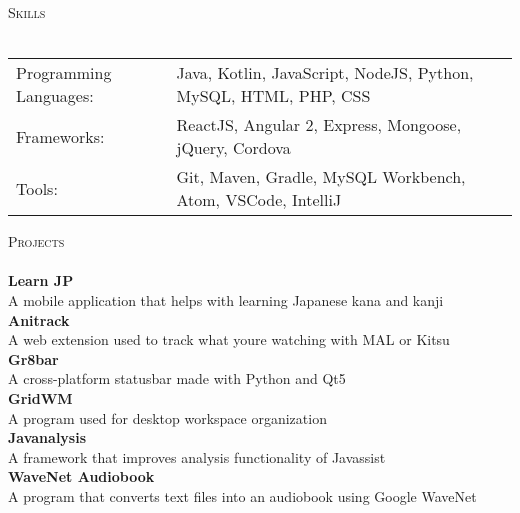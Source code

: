 \documentclass[a4paper]{article}
\newcommand{\lineunder} {
    \vspace*{-8pt} \\
    \hspace*{-18pt} \hrulefill \\
}
\newcommand{\header} [1] {
    {\hspace*{-18pt}\vspace*{6pt} \textsc{#1}}
    \vspace*{-6pt} \lineunder
}
\begin{document}
\header{Skills}
\vspace{2mm}
\begin{tabular}{ l l }
	Programming Languages: & Java, Kotlin, JavaScript, NodeJS, Python, MySQL, HTML, PHP, CSS \\
	Frameworks:            & ReactJS, Angular 2, Express, Mongoose, jQuery, Cordova          \\
	Tools:                 & Git, Maven, Gradle, MySQL Workbench, Atom, VSCode, IntelliJ     \\
\end{tabular}
\vspace{2mm}

\header{Projects}
{\textbf{Learn JP}}\\
A mobile application that helps with learning Japanese kana and kanji\\
\vspace*{2mm}
{\textbf{Anitrack}}\\
A web extension used to track what you\textquotesingle{}re watching with MAL or Kitsu\\
\vspace*{2mm}
{\textbf{Gr8bar}}\\
A cross-platform statusbar made with Python and Qt5\\
\vspace*{2mm}
{\textbf{GridWM}}\\
A program used for desktop workspace organization\\
\vspace*{2mm}
{\textbf{Javanalysis}}\\
A framework that improves analysis functionality of Javassist\\
\vspace*{2mm}
{\textbf{WaveNet Audiobook}}\\
A program that converts text files into an audiobook using Google WaveNet\\
\vspace*{2mm}
\end{document}
